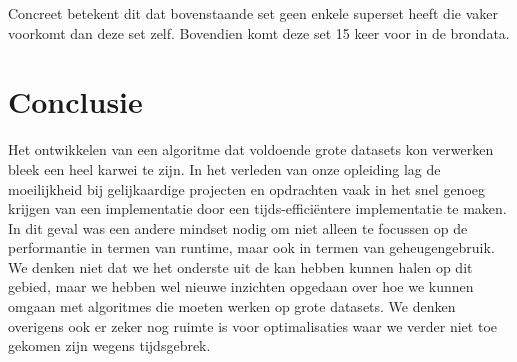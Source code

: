 \documentclass[11pt]{article}
\begin{document}
Concreet betekent dit dat bovenstaande set geen enkele superset heeft die vaker voorkomt dan deze set zelf. Bovendien komt deze set 15 keer voor in de brondata.


\section{Conclusie}
Het ontwikkelen van een algoritme dat voldoende grote datasets kon verwerken bleek een heel karwei te zijn. In het verleden van onze opleiding lag de moeilijkheid bij gelijkaardige projecten en opdrachten vaak in het snel genoeg krijgen van een implementatie door een tijds-effici\"entere implementatie te maken. In dit geval was een andere mindset nodig om niet alleen te focussen op de performantie in termen van runtime, maar ook in termen van geheugengebruik. We denken niet dat we het onderste uit de kan hebben kunnen halen op dit gebied, maar we hebben wel nieuwe inzichten opgedaan over hoe we kunnen omgaan met algoritmes die moeten werken op grote datasets. We denken overigens ook er zeker nog ruimte is voor optimalisaties waar we verder niet toe gekomen zijn wegens tijdsgebrek. 
\end{document}
